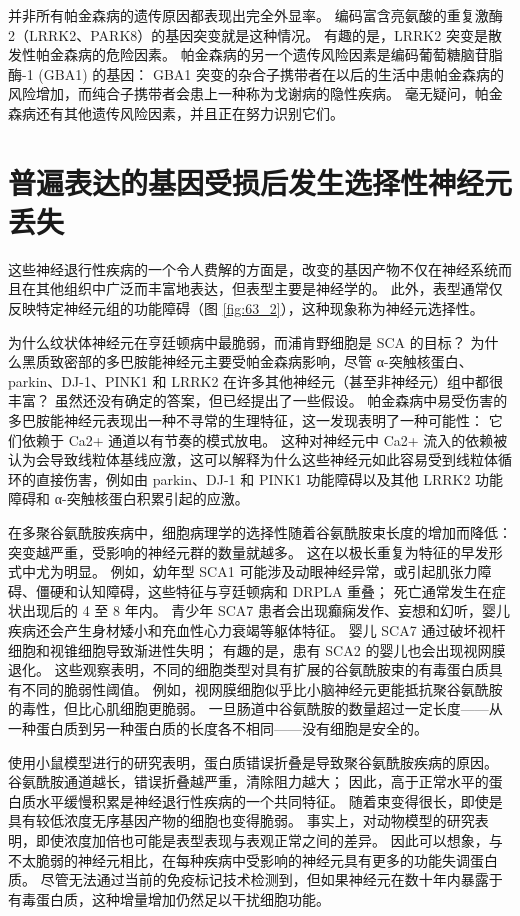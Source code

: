 并非所有帕金森病的遗传原因都表现出完全外显率。
编码富含亮氨酸的重复激酶 2（LRRK2、PARK8）的基因突变就是这种情况。
有趣的是，LRRK2 突变是散发性帕金森病的危险因素。
帕金森病的另一个遗传风险因素是编码葡萄糖脑苷脂酶-1 (GBA1) 的基因：
GBA1 突变的杂合子携带者在以后的生活中患帕金森病的风险增加，而纯合子携带者会患上一种称为戈谢病的隐性疾病。
毫无疑问，帕金森病还有其他遗传风险因素，并且正在努力识别它们。



\section{普遍表达的基因受损后发生选择性神经元丢失}

这些神经退行性疾病的一个令人费解的方面是，改变的基因产物不仅在神经系统而且在其他组织中广泛而丰富地表达，但表型主要是神经学的。
此外，表型通常仅反映特定神经元组的功能障碍（图 \ref{fig:63_2}），这种现象称为神经元选择性。


为什么纹状体神经元在亨廷顿病中最脆弱，而浦肯野细胞是 SCA 的目标？
为什么黑质致密部的多巴胺能神经元主要受帕金森病影响，尽管 α-突触核蛋白、parkin、DJ-1、PINK1 和 LRRK2 在许多其他神经元（甚至非神经元）组中都很丰富？
虽然还没有确定的答案，但已经提出了一些假设。
帕金森病中易受伤害的多巴胺能神经元表现出一种不寻常的生理特征，这一发现表明了一种可能性：
它们依赖于 Ca2+ 通道以有节奏的模式放电。
这种对神经元中 Ca2+ 流入的依赖被认为会导致线粒体基线应激，这可以解释为什么这些神经元如此容易受到线粒体循环的直接伤害，例如由 parkin、DJ-1 和 PINK1 功能障碍以及其他 LRRK2 功能障碍和 α-突触核蛋白积累引起的应激。


在多聚谷氨酰胺疾病中，细胞病理学的选择性随着谷氨酰胺束长度的增加而降低：
突变越严重，受影响的神经元群的数量就越多。
这在以极长重复为特征的早发形式中尤为明显。
例如，幼年型 SCA1 可能涉及动眼神经异常，或引起肌张力障碍、僵硬和认知障碍，这些特征与亨廷顿病和 DRPLA 重叠；
死亡通常发生在症状出现后的 4 至 8 年内。
青少年 SCA7 患者会出现癫痫发作、妄想和幻听，婴儿疾病还会产生身材矮小和充血性心力衰竭等躯体特征。
婴儿 SCA7 通过破坏视杆细胞和视锥细胞导致渐进性失明；
有趣的是，患有 SCA2 的婴儿也会出现视网膜退化。
这些观察表明，不同的细胞类型对具有扩展的谷氨酰胺束的有毒蛋白质具有不同的脆弱性阈值。
例如，视网膜细胞似乎比小脑神经元更能抵抗聚谷氨酰胺的毒性，但比心肌细胞更脆弱。
一旦肠道中谷氨酰胺的数量超过一定长度——从一种蛋白质到另一种蛋白质的长度各不相同——没有细胞是安全的。


使用小鼠模型进行的研究表明，蛋白质错误折叠是导致聚谷氨酰胺疾病的原因。
谷氨酰胺通道越长，错误折叠越严重，清除阻力越大；
因此，高于正常水平的蛋白质水平缓慢积累是神经退行性疾病的一个共同特征。
随着束变得很长，即使是具有较低浓度无序基因产物的细胞也变得脆弱。
事实上，对动物模型的研究表明，即使浓度加倍也可能是表型表现与表观正常之间的差异。
因此可以想象，与不太脆弱的神经元相比，在每种疾病中受影响的神经元具有更多的功能失调蛋白质。
尽管无法通过当前的免疫标记技术检测到，但如果神经元在数十年内暴露于有毒蛋白质，这种增量增加仍然足以干扰细胞功能。


